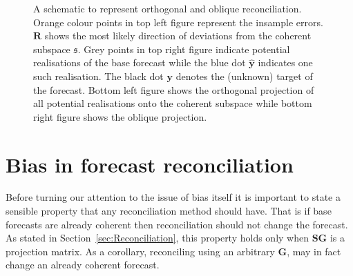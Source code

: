 \documentclass[12pt]{article}
\theoremstyle{definition}
\theoremstyle{property}
\begin{document}
\begin{figure}[!h]
\begin{subfigure}[!h]{0.48\textwidth}
        \caption{}
    \end{subfigure}
    \caption{A schematic to represent orthogonal and oblique reconciliation.  Orange colour points in top left figure represent the insample errors.$\bm{R}$ shows the most likely direction of deviations from the coherent subspace $\mathfrak{s}$. Grey points in top right figure indicate  potential realisations of the base forecast while the blue dot ${\hat{\bm y}}$ indicates one such realisation. The black dot ${\bm y}$ denotes the (unknown) target of the forecast. Bottom left figure shows the orthogonal projection of all potential realisations onto the coherent subspace while bottom right figure shows the oblique projection. } \label{fig:OthogonalVSOblique_projection_new}
\end{figure}

	
%			
	

	
	\section{Bias in forecast reconciliation}\label{sec:BiasInRecon}
	
	Before turning our attention to the issue of bias itself it is important to state a sensible property that any reconciliation method should have.  That is if base forecasts are already coherent then reconciliation should not change the forecast.  As stated in Section~\ref{sec:Reconciliation}, this property holds only when $\bm{SG}$ is a projection matrix.  As a corollary, reconciling using an arbitrary $\bm{G}$,  may in fact change an already coherent forecast.
	
\end{document}
